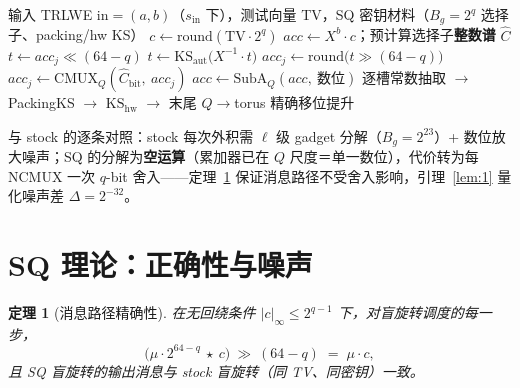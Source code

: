 \documentclass[11pt]{article}
\newtheorem{theorem}{定理}
\begin{document}
\begin{algorithm}[htbp]
\caption{SQ 尺度量化盲旋转（完整流程；单输出，$Q{=}2^{q}$，$q{=}16$）}
\label{alg:sq}
\begin{algorithmic}[1]
\Require 输入 TRLWE $\mathrm{in}{=}(a,b)$（$s_{\mathrm{in}}$ 下），测试向量 TV，SQ 密钥材料（$B_g{=}2^{q}$ 选择子、packing/hw KS）
\State $c \leftarrow \mathrm{round}(\mathrm{TV}\cdot 2^{q})$ 
\State $acc \leftarrow X^{b}\!\cdot\!c$；预计算选择子\textbf{整数谱} $\hat C$ 
  \For{$\text{bit}\in[0,\rho)$，$w\leftarrow 2^{\text{bit}}$}
     
      \State $t \leftarrow acc_j \ll (64-q)$ 
      \State $t \leftarrow \mathrm{KS}_{\mathrm{aut}}\bigl(X^{-1}\!\cdot\! t\bigr)$ 
      \State $acc_j \leftarrow \mathrm{round}\bigl(t \gg (64-q)\bigr)$ 
    \EndFor
      \State $acc_j \leftarrow \mathrm{CMUX}_{Q}(\hat C_{\mathrm{bit}},\ acc_j)$ 
    \EndFor
  \EndFor
  \State $acc \leftarrow \mathrm{SubA}_{Q}(acc,\ \text{数位})$ 
\EndFor
\State \Return 逐槽常数抽取 $\to$ PackingKS $\to$ $\mathrm{KS}_{\mathrm{hw}}$ $\to$ 末尾 $Q\!\to\!$torus 精确移位提升
\end{algorithmic}
\end{algorithm}

与 stock 的逐条对照：stock 每次外积需 $\ell$ 级 gadget 分解（$B_g{=}2^{23}$）+ 数位放大噪声；SQ 的分解为\textbf{空运算}（累加器已在 $Q$ 尺度＝单一数位），代价转为每 NCMUX 一次 $q$-bit 舍入——定理~\ref{thm:1} 保证消息路径不受舍入影响，引理~\ref{lem:1} 量化噪声差 $\Delta{=}2^{-32}$。

\section{SQ 理论：正确性与噪声}

\begin{theorem}[消息路径精确性]
\label{thm:1}
在无回绕条件 $|c|_\infty \le 2^{q-1}$ 下，对盲旋转调度的每一步，
\[
\bigl(\mu\cdot 2^{64-q}\ \star\ c\bigr)\ \gg\ (64-q)\;=\;\mu\cdot c,
\]
且 SQ 盲旋转的输出消息与 stock 盲旋转（同 TV、同密钥）一致。
\end{theorem}
\end{document}
